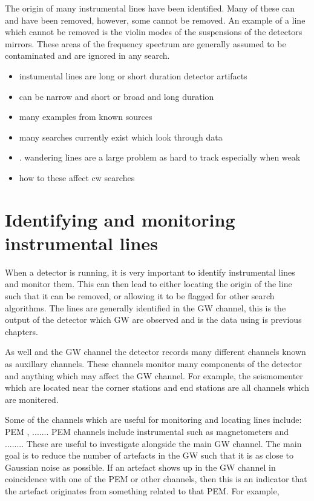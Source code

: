 The origin of many instrumental lines have been identified.
Many of these can and have been removed, however, some cannot be removed. 
An example of a line which cannot be removed is the violin modes of the suspensions of the detectors mirrors. 
These areas of the frequency spectrum are generally assumed to be contaminated and are ignored in any search.




\begin{itemize}
    \item instumental lines are long or short duration detector artifacts
    \item can be narrow and short or broad and long duration
    \item many examples from known sources
    \item many searches currently exist which look through data
    \item . wandering lines are a large problem as hard to track especially when weak
    \item how to these affect cw searches
\end{itemize}

\section{\label{detchar:monitor}Identifying and monitoring instrumental lines}

When a detector is running, it is very important to identify instrumental lines and monitor them.
This can then lead to either locating the origin of the line such that it can be removed, or allowing it to be flagged for other search algorithms.
The lines are generally identified in the \ac{GW} channel, this is the output of the detector which \ac{GW} are observed and is the data using is previous chapters.

As well and the \ac{GW} channel the detector records many different channels known as auxillary channels. 
These channels monitor many components of the detector and anything which may affect the \ac{GW} channel.
For example, the seismomenter which are located near the corner stations and end stations are all channels which are monitered. 

Some of the channels which are useful for monitoring and locating lines include: \ac{PEM} , .......
\ac{PEM} channels include instrumental such as magnetometers and ........
These are useful to investigate alongside the main \ac{GW} channel.
The main goal is to reduce the number of artefacts in the \ac{GW} such that it is as close to Gaussian noise as possible.
If an artefact shows up in the \ac{GW} channel in coincidence with one of the \ac{PEM} or other channels, then this is an indicator that the artefact originates from something related to that \ac{PEM}.
For example, 


